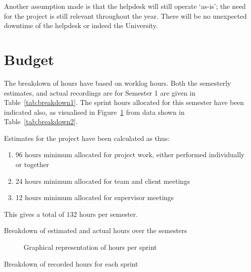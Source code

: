\documentclass[a4paper,12pt]{article}
\providecommand{\tightlist}{%
  \setlength{\itemsep}{0pt}\setlength{\parskip}{0pt}}
\begin{document}
Another assumption made is that the helpdesk will still operate `as-is';
the need for the project is still relevant throughout the year. There
will be no unexpected downtime of the helpdesk or indeed the University.

\section{Budget}\label{budget}

The breakdown of hours have based on worklog hours. Both the semesterly
estimates, and actual recordings are for Semester 1 are given in Table~\ref{tab:breakdown1}. The
sprint hours allocated for this semester have been indicated also, as visualised
in Figure~\ref{fig:breakdown2} from data shown in Table~\ref{tab:breakdown2}.

Estimates for the project have been calculated as thus:

\begin{enumerate}
\tightlist
\def\labelenumi{\arabic{enumi}.}
\item
  96 hours minimum allocated for project work, either performed
  individually or together
\item
  24 hours minimum allocated for team and client meetings
\item
  12 hours minimum allocated for supervisor meetings
\end{enumerate}

This gives a total of 132 hours per semester.


\begin{table}
  \centering
  \caption{Breakdown of estimated and actual hours over the semesters}
  \label{tab:breakdown1}
  \vspace{1em}
\end{table}

\begin{figure}
  \centering
  \caption{Graphical representation of hours per sprint}
  \label{fig:breakdown2}
\end{figure}

\begin{table}
  \centering
  \caption{Breakdown of recorded hours for each sprint}
  \label{tab:breakdown2}
  \vspace{1em}
\end{table}
\end{document}

